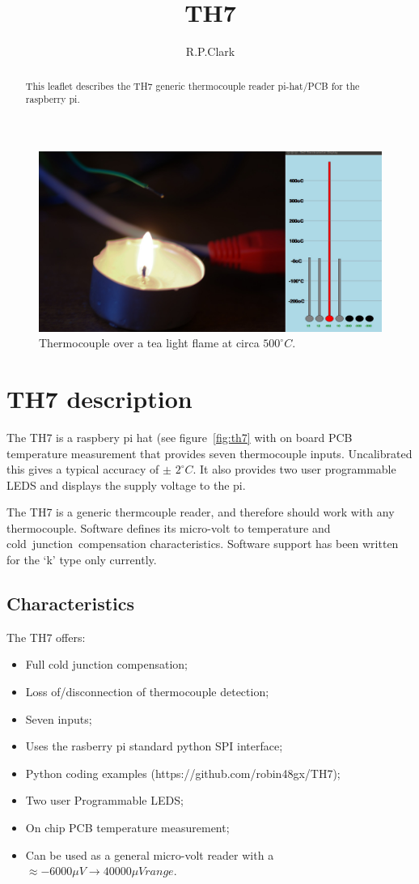 \documentclass[a4paper,10pt]{article}
\title{TH7}
\author{R.P.Clark}
\begin{document}
\maketitle
\begin{abstract}
This leaflet describes the TH7 generic thermocouple reader pi-hat/PCB for the raspberry pi.
\end{abstract}

\begin{figure}[ht]
 \centering
 \includegraphics[width=400pt]{TH7_tea_light.jpg}
 \caption{Thermocouple over a tea light flame at circa ${500}^{\circ} C$.}
 \label{fig:pi}
\end{figure}


\section{TH7 description}
The TH7 is a raspbery pi hat (see figure~\ref{fig:th7} with on board PCB temperature measurement that
provides seven thermocouple inputs.
Uncalibrated this gives a typical accuracy of $\pm$ ${2}^{\circ} C$.
It also provides two user programmable LEDS and displays the supply voltage to the pi.

The TH7 is a generic thermcouple reader, and therefore should work with any thermocouple.
Software defines its micro-volt to temperature and cold~junction~compensation characteristics.
Software support has been written for the `k' type only currently.

\clearpage
\subsection{Characteristics}
The TH7 offers:
\begin{itemize}
 \item Full cold junction compensation;
 \item Loss of/disconnection of thermocouple detection;
 \item Seven inputs;
 \item Uses the rasberry pi standard python SPI interface;
 \item Python coding examples (https://github.com/robin48gx/TH7);
 \item Two user Programmable LEDS;
 \item On chip PCB temperature measurement;
  \item Can be used as a general micro-volt reader with a $\approx -6000 \mu V \rightarrow 40000 \mu V range$.
\end{itemize} 
\end{document}
